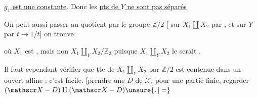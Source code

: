   \uline{$g_1$ est une constante}. Donc les \uline{pts de $Y$ ne sont pas séparés}

On peut aussi passer au quotient par le groupe $\mathbb Z/2$ [ sur $X_1\amalg X_2$ par , et sur $Y$ par $t\to1/t$] on trouve



où $X_1$ est ,  mais non $X_1\amalg_Y X_2/\mathbb Z_2$ puisque $X_1\amalg_Y X_2$ le serait .

Il faut cependant vérifier que tte   de $X_1\amalg_Y X_2$ par $\mathbb Z/2$ est contenue dans un ouvert affine : c'est facile. [prendre une  $D$ de $\mathscr X$,   pour une partie finie, regarder $(\mathscr X-D)\amalg(\mathscr X-D)\unsure{\mathpunct{.}|=}$


